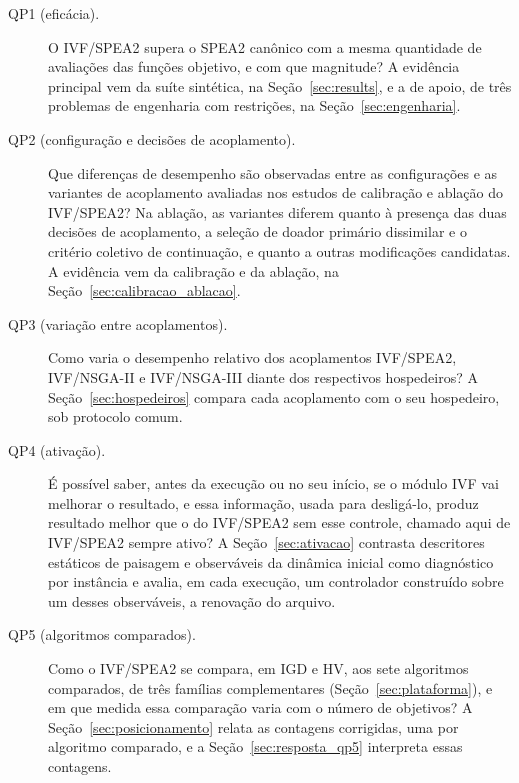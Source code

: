 \begin{description}
    \item[QP1 (eficácia).] O IVF/SPEA2 supera o SPEA2 canônico com a mesma quantidade de avaliações das funções objetivo, e com que magnitude? A evidência principal vem da suíte sintética, na Seção~\ref{sec:results}, e a de apoio, de três problemas de engenharia com restrições, na Seção~\ref{sec:engenharia}.
    \item[QP2 (configuração e decisões de acoplamento).] Que diferenças de desempenho são observadas entre as configurações e as variantes de acoplamento avaliadas nos estudos de calibração e ablação do IVF/SPEA2? Na ablação, as variantes diferem quanto à presença das duas decisões de acoplamento, a seleção de doador primário dissimilar e o critério coletivo de continuação, e quanto a outras modificações candidatas. A evidência vem da calibração e da ablação, na Seção~\ref{sec:calibracao_ablacao}.
    \item[QP3 (variação entre acoplamentos).] Como varia o desempenho relativo dos acoplamentos IVF/SPEA2, IVF/NSGA-II e IVF/NSGA-III diante dos respectivos hospedeiros? A Seção~\ref{sec:hospedeiros} compara cada acoplamento com o seu hospedeiro, sob protocolo comum.
    \item[QP4 (ativação).] É possível saber, antes da execução ou no seu início, se o módulo IVF vai melhorar o resultado, e essa informação, usada para desligá-lo, produz resultado melhor que o do IVF/SPEA2 sem esse controle, chamado aqui de IVF/SPEA2 sempre ativo? A Seção~\ref{sec:ativacao} contrasta descritores estáticos de paisagem e observáveis da dinâmica inicial como diagnóstico por instância e avalia, em cada execução, um controlador construído sobre um desses observáveis, a renovação do arquivo.
    \item[QP5 (algoritmos comparados).] Como o IVF/SPEA2 se compara, em IGD e HV, aos sete algoritmos comparados, de três famílias complementares (Seção~\ref{sec:plataforma}), e em que medida essa comparação varia com o número de objetivos? A Seção~\ref{sec:posicionamento} relata as contagens corrigidas, uma por algoritmo comparado, e a Seção~\ref{sec:resposta_qp5} interpreta essas contagens.
\end{description}

% 

